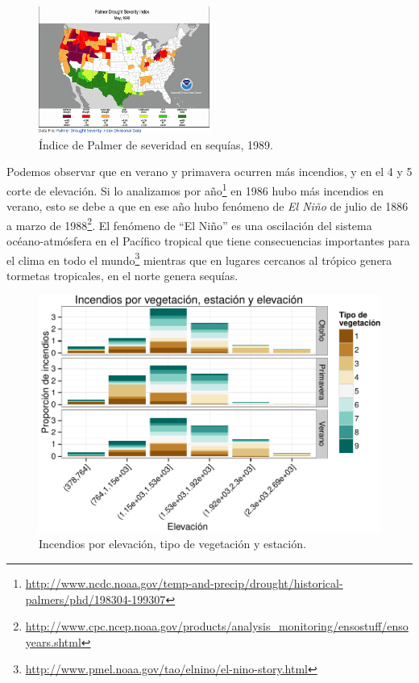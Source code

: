 \documentclass[12,]{article}
\let\rmarkdownfootnote\footnote%
\def\footnote{\protect\rmarkdownfootnote}
\begin{document}
\begin{figure}[H]
\centering
\includegraphics[width=0.5\textwidth]{imagenes/IP92.png}
\caption{Índice de Palmer de severidad en sequías, 1989.}

\end{figure}

Podemos observar que en verano y primavera ocurren más incendios, y en
el 4 y 5 corte de elevación. Si lo analizamos por año\footnote{\url{http://www.ncdc.noaa.gov/temp-and-precip/drought/historical-palmers/phd/198304-199307}}
en 1986 hubo más incendios en verano, esto se debe a que en ese año hubo
fenómeno de \emph{El Niño} de julio de 1886 a marzo de 1988\footnote{\url{http://www.cpc.ncep.noaa.gov/products/analysis_monitoring/ensostuff/ensoyears.shtml}}.
El fenómeno de ``El Niño'' es una oscilación del sistema
océano-atmósfera en el Pacífico tropical que tiene consecuencias
importantes para el clima en todo el mundo\footnote{\url{http://www.pmel.noaa.gov/tao/elnino/el-nino-story.html}}
mientras que en lugares cercanos al trópico genera tormetas tropicales,
en el norte genera sequías.

\begin{figure}[htbp]
\centering
\includegraphics{tarea2_files/figure-latex/unnamed-chunk-5-1.pdf}
\caption{Incendios por elevación, tipo de vegetación y estación.}
\end{figure}
\end{document}
